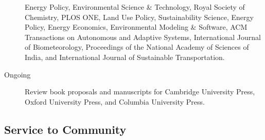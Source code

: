\documentclass[10pt]{article}
\begin{document}
\begin{description}
            Energy Policy,
            Environmental Science \& Technology,
            Royal Society of Chemistry,
            PLOS ONE,
            Land Use Policy,
            Sustainability Science,
            Energy Policy,
            Energy Economics,
            Environmental Modeling \& Software,
            ACM Transactions on Autonomous and Adaptive Systems,
            International Journal of Biometeorology,
            Proceedings of the National Academy of Sciences of India,
            and
            International Journal of Sustainable Transportation.
            \item[Ongoing] Review book proposals and manuscripts for Cambridge University Press, Oxford University Press, and Columbia University Press.
        \end{description}
    \subsection{Service to Community}
\end{document}
